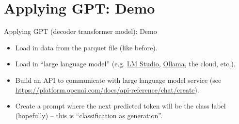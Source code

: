 \documentclass[aspectratio=169, xcolor=dvipsnames, handout]{beamer} %
\begin{document}
\section{Applying GPT: Demo}
\begin{frame}{Applying GPT (decoder transformer model): Demo}
\pause
 \begin{itemize}
  \item Load in data from the parquet file (like before). \pause
  \item Load in ``large language model'' (e.g. \href{https://lmstudio.ai/}{\underline{LM Studio}}, \href{https://ollama.com/}{\underline{Ollama}}, the cloud, etc.). \pause
  \item Build an API to communicate with large language model service (see \url{https://platform.openai.com/docs/api-reference/chat/create}). \pause
  \item Create a prompt where the next predicted token will be the class label (hopefully) -- this is ``classification as generation''.
 \end{itemize}

\end{frame}
\end{document}

